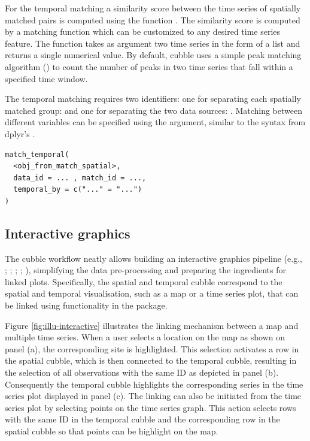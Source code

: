 \documentclass[
  shortnames]{jss}
\begin{document}
For the temporal matching a similarity score between the time series of spatially matched pairs is computed using the function . The similarity score is computed by a matching function which can be customized to any desired time series feature. The function  takes as argument two time series in the form of a list and returns a single numerical value. By default, cubble uses a simple peak matching algorithm () to count the number of peaks in two time series that fall within a specified time window.

The temporal matching requires two identifiers: one for separating each spatially matched group:  and one for separating the two data sources: . Matching between different variables can be specified using the  argument, similar to the  syntax from dplyr's .

\begin{verbatim}
match_temporal(
  <obj_from_match_spatial>, 
  data_id = ... , match_id = ..., 
  temporal_by = c("..." = "...")
)
\end{verbatim}

\hypertarget{interactive-graphics}{%
\subsection{Interactive graphics}\label{interactive-graphics}}

The cubble workflow neatly allows building an interactive graphics pipeline (e.g., \citet{buja1988elements}; \citet{buja1996interactive}; \citet{sutherland2000orca}; \citet{xie2014reactive}; \citet{cheng2016enabling}), simplifying the data pre-processing and preparing the ingredients for linked plots. Specifically, the spatial and temporal cubble correspond to the spatial and temporal visualisation, such as a map or a time series plot, that can be linked using functionality in the  \citep{crosstalk} package.

Figure \ref{fig:illu-interactive} illustrates the linking mechanism between a map and multiple time series. When a user selects a location on the map as shown on panel (a), the corresponding site is highlighted. This selection activates a row in the spatial cubble, which is then connected to the temporal cubble, resulting in the selection of all observations with the same ID as depicted in panel (b). Consequently the temporal cubble highlights the corresponding series in the time series plot displayed in panel (c). The linking can also be initiated from the time series plot by selecting points on the time series graph. This action selects rows with the same ID in the temporal cubble and the corresponding row in the spatial cubble so that points can be highlight on the map.
\end{document}

